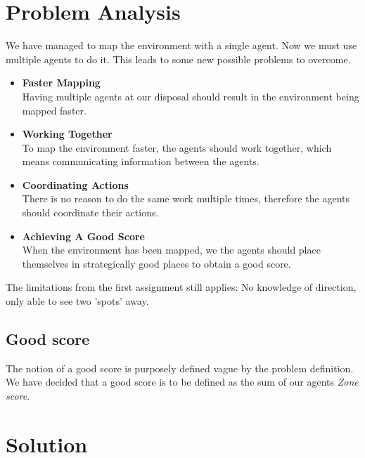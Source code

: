 \documentclass[11pt]{report}
\begin{document}
\section*{Problem Analysis}
We have managed to map the environment with a single agent. Now we must use multiple agents to do it. This leads to some new possible problems to overcome.
\begin{itemize}
	\item \textbf{Faster Mapping}\\
	Having multiple agents at our disposal should result in the environment being mapped faster.
	\item \textbf{Working Together}\\
	To map the environment faster, the agents should work together, which means communicating information between the agents.
	\item \textbf{Coordinating Actions}\\
	There is no reason to do the same work multiple times, therefore the agents should coordinate their actions.
	\item \textbf{Achieving A Good Score}\\
	When the environment has been mapped, we the agents should place themselves in strategically good places to obtain a good score.
\end{itemize}

The limitations from the first assignment still applies: No knowledge of direction, only able to see two 'spots' away.

\subsection*{Good score}
The notion of a good score is purposely defined vague by the problem definition. We have decided that a good score is to be defined as the sum of our agents \emph{Zone score}.

\section*{Solution}
\end{document}
